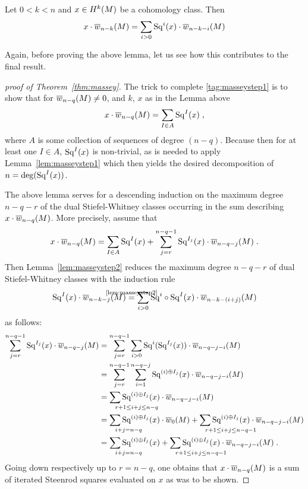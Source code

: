 \begin{Lem}\label{lem:masseystep2}
  Let $0<k<n$ and $x\in H^k(M)$ be a cohomology class.
  Then
  \begin{gather*}
    x\cdot{\overline{w}_{n-k}}(M) = \sum_{i>0}\mathrm{Sq}^{i}(x)\cdot{\overline{w}_{n-k-i}}(M)
  \end{gather*}
\end{Lem}
Again, before proving the above lemma, let us see how this contributes
to the final result.
\begin{proof}[proof of Theorem~\ref{thm:massey}]
  The trick to complete \ref{tag:masseystep1} is to show that
  for ${\overline{w}_{n-q}}(M)\neq 0$, and $k$, $x$ as in the Lemma above
  \begin{gather*}
    x\cdot {\overline{w}_{n-q}}(M) = \sum_{I\in A}\mathrm{Sq}^{I}(x)
    \;,
  \end{gather*}
  where $A$ is some collection of sequences of degree $(n-q)$.
  Because then for at least one $I\in A$, $\mathrm{Sq}^{I}(x)$ is non-trivial,
  as is needed to apply Lemma~\ref{lem:masseystep1} which then yields
  the desired decomposition of $n=\deg(\mathrm{Sq}^{I}(x))$.

  The above lemma serves for a descending induction on the maximum
  degree $n-q-r$ of the dual Stiefel-Whitney classes occurring in
  the sum describing $x\cdot{\overline{w}_{n-q}}(M)$.
  More precisely, assume that
  \begin{gather*}
    x\cdot {\overline{w}_{n-q}}(M)
    = \sum_{I\in A}\mathrm{Sq}^{I}(x)
    + \sum_{j=r}^{n-q-1}\mathrm{Sq}^{I_j}(x)\cdot{\overline{w}_{n-q-j}}(M)
    \;.
  \end{gather*}
  Then Lemma~\ref{lem:masseystep2} reduces the maximum degree $n-q-r$
  of dual Stiefel-Whitney classes with the induction rule
  \begin{gather*}
    \Sq I(x)\cdot\dualw{n-k-j}{M}
    \cequalsby{\ref{lem:masseystep2}}
    \sum_{i>0}\Sq i\circ\Sq I(x)\cdot\dualw{n-k-(i+j)}{M}
  \end{gather*}
  as follows:
  \begin{align*}
    \sum_{j=r}^{n-q-1}\Sq{I_j}(x)\cdot\dualw{n-q-j}{M}
    &= \sum_{j=r}^{n-q-1}\sum_{i>0}
      \Sq i(\Sq{I_j}(x))\cdot \dualw{n-q-j-i}{M}
    \\
    &= \sum_{j=r}^{n-q-1}\sum_{i=1}^{n-q-j}
      \Sq{(i)\concat I_j}(x)\cdot \dualw{n-q-j-i}{M}
    \\
    &= \sum_{\mathrlap{r+1\leq i+j\leq n-q}}
      \Sq{(i)\concat I_j}(x)\cdot \dualw{n-q-j-i}{M}
    \\
    &=\sum_{\mathrlap{i+j=n-q}} \Sq{(i)\concat I_j}(x)\cdot \dualw0{M}
      + \sum_{\mathrlap{r+1\leq i+j\leq n-q-1}}
      \Sq{(i)\concat I_j}(x)\cdot \dualw{n-q-j-i}{M}
    \\
    &=\sum_{\mathrlap{i+j=n-q}} \Sq{(i)\concat I_j}(x)
      + \sum_{\mathrlap{r+1\leq i+j\leq n-q-1}}
      \Sq{(i)\concat I_j}(x)\cdot \dualw{n-q-j-i}{M}
      \;.
  \end{align*}
  Going down respectively up to $r=n-q$, one obtains that
  $x\cdot{\overline{w}_{n-q}}(M)$ is a sum of iterated Steenrod squares
  evaluated on $x$ as was to be shown.
\end{proof}

